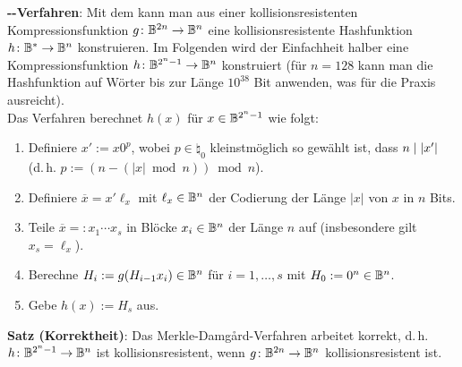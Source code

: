 \textbf{--Verfahren}:
Mit dem  kann man
aus einer kollisionsresistenten Kompressionsfunktion $g\colon \mathbb{B}^{2n} \to \mathbb{B}^n$
eine kollisionsresistente Hashfunktion $h\colon \mathbb{B}^\ast \to \mathbb{B}^n$ konstruieren.
Im Folgenden wird der Einfachheit halber eine Kompressionsfunktion $h\colon \mathbb{B}^{2^n-1} \to \mathbb{B}^n$
konstruiert (für $n = 128$ kann man die Hashfunktion auf Wörter bis zur Länge $10^{38}$ Bit
anwenden, was für die Praxis ausreicht).\\
Das Verfahren berechnet $h(x)$ für $x \in \mathbb{B}^{2^n-1}$ wie folgt:
\begin{enumerate}
    \item
    Definiere $x' := x 0^p$, wobei $p \in \natural_0$ kleinstmöglich so gewählt ist, dass
    $n \mid |x'|$\\
    (d.\,h. $p := (n - (|x| \bmod n)) \bmod n$).
    
    \item
    Definiere $\overline{x} = x' \ell_x$ mit $\ell_x \in \mathbb{B}^n$
    der Codierung der Länge $|x|$ von $x$ in $n$ Bits.
    
    \item
    Teile $\overline{x} =: x_1 \dotsb x_s$ in Blöcke $x_i \in \mathbb{B}^n$ der Länge $n$ auf
    (insbesondere gilt $x_s = \ell_x$).
    
    \item
    Berechne $H_i := g(H_{i-1} x_i) \in \mathbb{B}^n$ für $i = 1, \dotsc, s$ mit $H_0 := 0^n \in \mathbb{B}^n$.
    
    \item
    Gebe $h(x) := H_s$ aus.
\end{enumerate}

\linie

\textbf{Satz (Korrektheit)}:
Das Merkle-Damgård-Verfahren arbeitet korrekt, d.\,h. $h\colon \mathbb{B}^{2^n-1} \to \mathbb{B}^n$ ist
kollisionsresistent, wenn $g\colon \mathbb{B}^{2n} \to \mathbb{B}^n$ kollisionsresistent ist.

